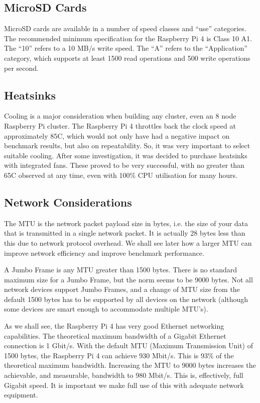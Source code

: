 \documentclass{report}
\begin{document}
%
%
\subsection{MicroSD Cards}
MicroSD cards are available in a number of speed classes and ``use'' categories. The recommended minimum specification for the Raspberry Pi 4 is Class 10 A1. The ``10'' refers to a 10 MB/s write speed. The ``A'' refers to the ``Application'' category, which supports at least 1500 read operations and 500 write operations per second.


%
%
\subsection{Heatsinks}
Cooling is a major consideration when building any cluster, even an 8 node Raspberry Pi cluster. The Raspberry Pi 4 throttles back the clock speed at approximately 85\degree C, which would not only have had a negative impact on benchmark results, but also on repeatability. So, it was very important to select suitable cooling. After some investigation, it was decided to purchase heatsinks with integrated fans. These proved to be very successful, with no greater than 65\degree C observed at any time, even with 100\% CPU utilisation for many hours. 


%
%
\subsection{Network Considerations}

The MTU is the network packet payload size in bytes, i.e. the size of your data that is transmitted in a single network packet. It is actually 28 bytes less than this due to network protocol overhead. We shall see later how a larger MTU can improve network efficiency and improve benchmark performance.

A Jumbo Frame is any MTU greater than 1500 bytes. There is no standard maximum size for a Jumbo Frame, but the norm seems to be 9000 bytes. Not all network devices support Jumbo Frames, and a change of MTU size from the default 1500 bytes has to be supported by all devices on the network (although some devices are smart enough to accommodate multiple MTU's).

As we shall see, the Raspberry Pi 4 has very good Ethernet networking capabilities. The theoretical maximum bandwidth of a Gigabit Ethernet connection is 1 Gbit/s. With the default MTU (Maximum Transmission Unit) of 1500 bytes, the Raspberry Pi 4 can achieve 930 Mbit/s. This is 93\% of the theoretical maximum bandwidth. Increasing the MTU to 9000 bytes increases the achievable, and measurable, bandwidth to 980 Mbit/s. This is, effectively, full Gigabit speed. It is important we make full use of this with adequate network equipment.
\end{document}
